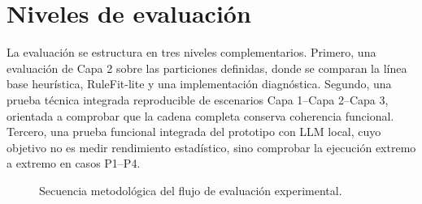 \section{Niveles de evaluación}

La evaluación se estructura en tres niveles complementarios. Primero, una evaluación
de Capa 2 sobre las particiones definidas, donde se comparan la línea base heurística,
RuleFit-lite y una implementación diagnóstica. Segundo, una prueba técnica integrada reproducible de
escenarios Capa 1--Capa 2--Capa 3, orientada a comprobar que la cadena completa conserva
coherencia funcional. Tercero, una prueba funcional integrada del prototipo con LLM local,
cuyo objetivo no es medir rendimiento estadístico, sino comprobar la ejecución
extremo a extremo en casos P1--P4.

\begin{figure}[htbp]
\centering
\small
{}
\caption{Secuencia metodológica del flujo de evaluación experimental.}
\label{fig:flujo-evaluacion-cap9}
\end{figure}

